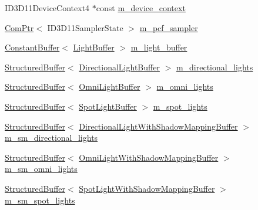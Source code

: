 \begin{DoxyCompactItemize}
\item 
I\+D3\+D11\+Device\+Context4 $\ast$const \hyperlink{structmage_1_1_l_buffer_pass_aa3f3eb2e2e4303398553eb9f07344845}{m\+\_\+device\+\_\+context}
\item 
\hyperlink{namespacemage_ae74f374780900893caa5555d1031fd79}{Com\+Ptr}$<$ I\+D3\+D11\+Sampler\+State $>$ \hyperlink{structmage_1_1_l_buffer_pass_aaf8dacd30171f31fe2a898fbdd91a990}{m\+\_\+pcf\+\_\+sampler}
\item 
\hyperlink{classmage_1_1_constant_buffer}{Constant\+Buffer}$<$ \hyperlink{structmage_1_1_light_buffer}{Light\+Buffer} $>$ \hyperlink{structmage_1_1_l_buffer_pass_a5946e3e691734567824644f8d1ec77b9}{m\+\_\+light\+\_\+buffer}
\item 
\hyperlink{classmage_1_1_structured_buffer}{Structured\+Buffer}$<$ \hyperlink{structmage_1_1_directional_light_buffer}{Directional\+Light\+Buffer} $>$ \hyperlink{structmage_1_1_l_buffer_pass_a90327556a34fe3a56e6980accead0c44}{m\+\_\+directional\+\_\+lights}
\item 
\hyperlink{classmage_1_1_structured_buffer}{Structured\+Buffer}$<$ \hyperlink{structmage_1_1_omni_light_buffer}{Omni\+Light\+Buffer} $>$ \hyperlink{structmage_1_1_l_buffer_pass_afc2754b9d3a3b1c2171cd1a6e5b2349d}{m\+\_\+omni\+\_\+lights}
\item 
\hyperlink{classmage_1_1_structured_buffer}{Structured\+Buffer}$<$ \hyperlink{structmage_1_1_spot_light_buffer}{Spot\+Light\+Buffer} $>$ \hyperlink{structmage_1_1_l_buffer_pass_af1612aa2a8d24303ebcf9e72125698f3}{m\+\_\+spot\+\_\+lights}
\item 
\hyperlink{classmage_1_1_structured_buffer}{Structured\+Buffer}$<$ \hyperlink{structmage_1_1_directional_light_with_shadow_mapping_buffer}{Directional\+Light\+With\+Shadow\+Mapping\+Buffer} $>$ \hyperlink{structmage_1_1_l_buffer_pass_ad9a714aed008db64b5a7d9be1a5f741c}{m\+\_\+sm\+\_\+directional\+\_\+lights}
\item 
\hyperlink{classmage_1_1_structured_buffer}{Structured\+Buffer}$<$ \hyperlink{structmage_1_1_omni_light_with_shadow_mapping_buffer}{Omni\+Light\+With\+Shadow\+Mapping\+Buffer} $>$ \hyperlink{structmage_1_1_l_buffer_pass_aa5fa46c76d4d7d58141eeb021bb9f20c}{m\+\_\+sm\+\_\+omni\+\_\+lights}
\item 
\hyperlink{classmage_1_1_structured_buffer}{Structured\+Buffer}$<$ \hyperlink{structmage_1_1_spot_light_with_shadow_mapping_buffer}{Spot\+Light\+With\+Shadow\+Mapping\+Buffer} $>$ \hyperlink{structmage_1_1_l_buffer_pass_a5630c1edc1d0833d08e0350bef5ec8a5}{m\+\_\+sm\+\_\+spot\+\_\+lights}

\end{DoxyCompactItemize}
